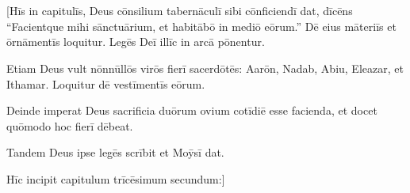 \chapter{}


\vspace*{-1.4cm}
\thispagestyle{empty}

[Hīs in capitulīs, Deus cōnsilium tabernāculī sibi cōnficiendī dat, dīcēns ``Facientque mihi sānctuārium, et habitābō in mediō eōrum.'' Dē eius māteriīs et ōrnāmentīs loquitur. Legēs Deī illīc in arcā pōnentur.

Etiam Deus vult nōnnūllōs virōs fierī sacerdōtēs: Aarōn, Nadab, Abiu, Eleazar, et Ithamar. Loquitur dē vestīmentīs eōrum.

Deinde imperat Deus sacrificia duōrum ovium cotīdiē esse facienda, et docet quōmodo hoc fierī dēbeat.

Tandem Deus ipse legēs scrībit et Moȳsī dat.

Hīc incipit capitulum trīcēsimum secundum:]


